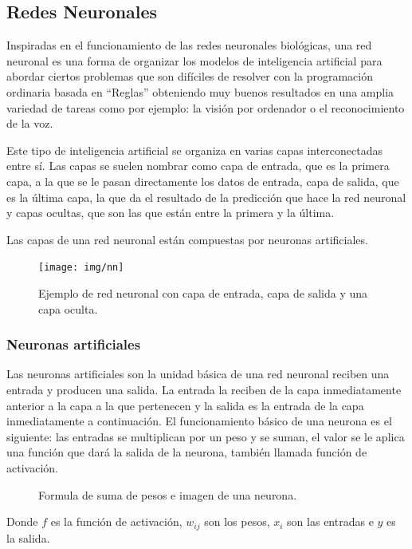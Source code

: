 \documentclass[12pt,a4paper]{article}
\begin{document}
\subsection{Redes Neuronales}
Inspiradas en el funcionamiento de las redes neuronales biológicas, una red neuronal es una forma de organizar los modelos de inteligencia artificial para abordar ciertos problemas que son difíciles de resolver con la programación ordinaria basada en ``Reglas'' obteniendo muy buenos resultados en una amplia variedad de tareas como por ejemplo: la visión por ordenador o el reconocimiento de la voz.
\bigskip

Este tipo de inteligencia artificial se organiza en varias capas interconectadas entre sí. Las capas se suelen nombrar como capa de entrada, que es la primera capa, a la que se le pasan directamente los datos de entrada, capa de salida, que es la última capa, la que da el resultado de la predicción que hace la red neuronal y capas ocultas, que son las que están entre la primera y la última.
\bigskip

Las capas de una red neuronal están compuestas por neuronas artificiales.

\begin{figure}[H]
\centering
\texttt{[image: img/nn]}
\caption{Ejemplo de red neuronal con capa de entrada, capa de salida y una capa oculta.}
\end{figure}

\subsubsection{Neuronas artificiales}
Las neuronas artificiales son la unidad básica de una red neuronal reciben una entrada y producen una salida. La entrada la reciben de la capa inmediatamente anterior a la capa a la que pertenecen y la salida es la entrada de la capa inmediatamente a continuación. El funcionamiento básico de una neurona es el siguiente: las entradas se multiplican por un peso y se suman, el valor se le aplica una función que dará la salida de la neurona, también llamada función de activación.

\begin{figure}[H]
\centering
{}%
\qquad
{}%
\caption{Formula de suma de pesos e imagen de una neurona.}
\end{figure}

Donde $f$ es la función de activación, $w_{ij}$ son los pesos, $x_{i}$ son las entradas e $y$ es la salida.
\bigskip
\end{document}
